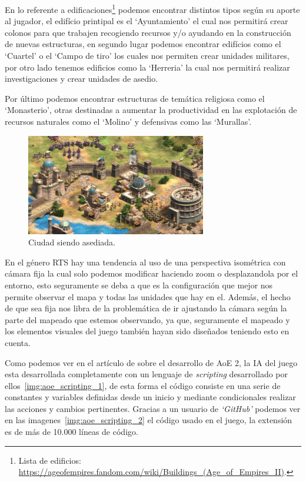 En lo referente a edificaciones\footnote{Lista de edificios: \url{https://ageofempires.fandom.com/wiki/Buildings_(Age_of_Empires_II)}.}
podemos encontrar distintos tipos según su aporte al jugador,
el edifício printipal es el `Ayuntamiento' el cual nos permitirá crear colonos para que trabajen
recogiendo recursos y/o ayudando en la construcción de nuevas estructuras, en segundo lugar podemos
encontrar edifícios como el `Cuartel' o el `Campo de tiro' los cuales nos permiten crear unidades
militares, por otro lado tenemos edificios como la `Herreria' la cual nos permitirá realizar investigaciones
y crear unidades de asedio.

Por último podemos encontrar estructuras de temática religiosa como el `Monasterio', otras destinadas
a aumentar la productividad en las explotación de recursos naturales como el `Molino'
y defensivas como las `Murallas'. 

\begin{figure}[ht]
\centering
\includegraphics[width=0.7\textwidth]{imagenes/marco_teo/referentes/aoe_2.png}
\caption{Ciudad siendo asediada.}
\label{img:aoe_2}
\end{figure}

En el género \ac{RTS} hay una tendencia al uso de una perspectiva isométrica con cámara fija
la cual solo podemos modificar haciendo zoom o desplazandola por el entorno, esto seguramente
se deba a que es la configuración que mejor nos permite observar el mapa y todas las unidades que
hay en el. Además, el hecho de que sea fija nos libra de la problemática de ir ajustando la
cámara según la parte del mapeado que estemos observando, ya que, seguramente el mapeado y los elementos
visuales del juego también hayan sido diseñados teniendo esto en cuenta.

Como podemos ver en el artículo de \citeauthor*{Pritchard2000} sobre el desarrollo de \ac{AoE} 2,
la \ac{IA} del juego esta desarrollada completamente con un lenguaje de \textit{scripting} desarrollado
por ellos~\ref{img:aoe_scripting_1}, de esta forma el código consiste en una serie de constantes y variables definidas desde un
inicio y mediante condicionales realizar las acciones  y cambios pertinentes. Gracias a un usuario
de \textit{`GitHub'} podemos ver en las imagenes~\ref{img:aoe_scripting_2} el código usado en el juego, la extensión es 
de  más de 10.000 líneas de código.

